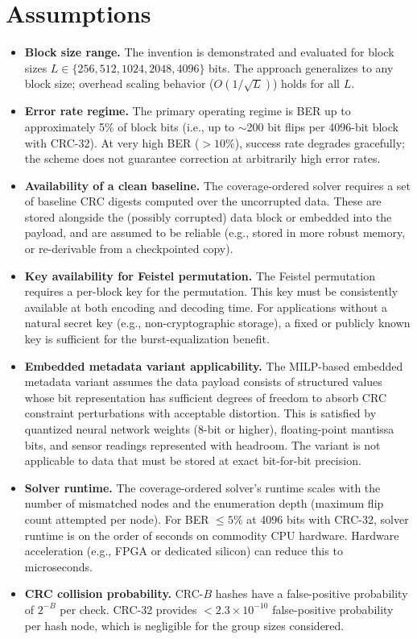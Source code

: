 \section*{Assumptions}
\begin{itemize}

    \item \textbf{Block size range.} The invention is demonstrated and evaluated for block sizes $L \in \{256, 512, 1024, 2048, 4096\}$ bits.
    The approach generalizes to any block size; overhead scaling behavior ($O(1/\sqrt{L})$) holds for all $L$.

    \item \textbf{Error rate regime.} The primary operating regime is BER up to approximately 5\% of block bits (i.e., up to $\sim$200 bit flips per 4096-bit block with CRC-32).
    At very high BER ($> 10\%$), success rate degrades gracefully; the scheme does not guarantee correction at arbitrarily high error rates.

    \item \textbf{Availability of a clean baseline.} The coverage-ordered solver requires a set of baseline CRC digests computed over the uncorrupted data.
    These are stored alongside the (possibly corrupted) data block or embedded into the payload, and are assumed to be reliable (e.g., stored in more robust memory, or re-derivable from a checkpointed copy).

    \item \textbf{Key availability for Feistel permutation.} The Feistel permutation requires a per-block key for the permutation.
    This key must be consistently available at both encoding and decoding time.
    For applications without a natural secret key (e.g., non-cryptographic storage), a fixed or publicly known key is sufficient for the burst-equalization benefit.

    \item \textbf{Embedded metadata variant applicability.} The MILP-based embedded metadata variant assumes the data payload consists of structured values whose bit representation has sufficient degrees of freedom to absorb CRC constraint perturbations with acceptable distortion.
    This is satisfied by quantized neural network weights (8-bit or higher), floating-point mantissa bits, and sensor readings represented with headroom.
    The variant is not applicable to data that must be stored at exact bit-for-bit precision.

    \item \textbf{Solver runtime.} The coverage-ordered solver's runtime scales with the number of mismatched nodes and the enumeration depth (maximum flip count attempted per node).
    For BER $\leq 5\%$ at 4096 bits with CRC-32, solver runtime is on the order of seconds on commodity CPU hardware.
    Hardware acceleration (e.g., FPGA or dedicated silicon) can reduce this to microseconds.

    \item \textbf{CRC collision probability.} CRC-$B$ hashes have a false-positive probability of $2^{-B}$ per check.
    CRC-32 provides $< 2.3 \times 10^{-10}$ false-positive probability per hash node, which is negligible for the group sizes considered.

\end{itemize}
